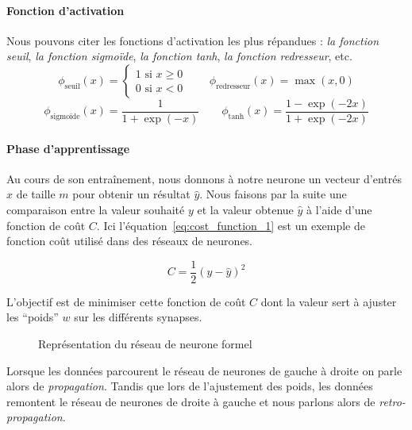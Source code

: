 \paragraph{Fonction d'activation}
Nous pouvons citer les fonctions d'activation les plus répandues : \textit{la fonction seuil}, \textit{la fonction sigmo\"ide}, \textit{la fonction tanh}, \textit{la fonction redresseur}, etc.
\begin{equation}
	\phi_\text{seuil}(x) =
	\begin{cases}
		1 \text{ si } x \geq 0 \\
		0 \text{ si } x < 0
	\end{cases} \qquad
	\phi_\text{redresseur}(x) = \max(x, 0)
\end{equation}
\begin{equation}
	\phi_\text{sigmo\"ide}(x) = \frac{1}{1+\exp(-x)} \qquad
	\phi_\text{tanh}(x) = \frac{1-\exp(-2x)}{1+\exp(-2x)}
\end{equation}

\paragraph{Phase d'apprentissage}
Au cours de son entraînement, nous donnons à notre neurone un vecteur d'entrés $x$ de taille $m$ pour obtenir un résultat $\hat y$.
Nous faisons par la suite une comparaison entre la valeur souhaité $y$ et la valeur obtenue $\hat y$ à l'aide d'une fonction de coût $C$.
Ici l'équation~\ref{eq:cost_function_1} est un exemple de fonction coût utilisé dans des réseaux de neurones.

\begin{equation}
	\label{eq:cost_function_1} C = \frac{1}{2}(y-\hat y)^2
\end{equation}

L'objectif est de minimiser cette fonction de coût $C$ dont la valeur sert à ajuster les ``poids'' $w$ sur les différents synapses.
\begin{figure}[ht]	
	\centering
	\caption{Représentation du réseau de neurone formel}
\end{figure}
Lorsque les données parcourent le réseau de neurones de gauche à droite on parle alors de \textit{propagation}.
Tandis que lors de l'ajustement des poids, les données remontent le réseau de neurones de droite à gauche et nous parlons alors de \textit{retro-propagation}.

